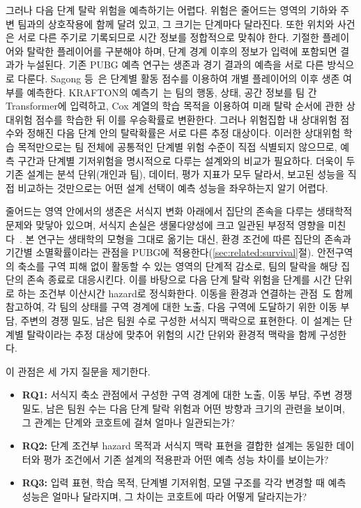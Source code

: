 그러나 다음 단계 탈락 위험을 예측하기는 어렵다.
위험은 줄어드는 영역의 기하와 주변 팀과의 상호작용에 함께 달려 있고, 그 크기는 단계마다 달라진다.
또한 위치와 사건은 서로 다른 주기로 기록되므로 시간 정보를 정합적으로 맞춰야 한다.
기절한 플레이어와 탈락한 플레이어를 구분해야 하며, 단계 경계 이후의 정보가 입력에 포함되면 결과가 누설된다.
기존 PUBG 예측 연구는 생존과 경기 결과의 예측을 서로 다른 방식으로 다룬다.
Sagong 등~\cite{Sagong25a,Sagong25b}은 단계별 활동 점수를 이용하여 개별 플레이어의 이후 생존 여부를 예측한다.
KRAFTON의 예측기~\cite{KRAFTON}는 팀의 행동, 상태, 공간 정보를 팀 간 Transformer에 입력하고, Cox 계열의 학습 목적을 이용하여 미래 탈락 순서에 관한 상대위험 점수를 학습한 뒤 이를 우승확률로 변환한다.
그러나 위험집합 내 상대위험 점수와 정해진 다음 단계 안의 탈락확률은 서로 다른 추정 대상이다.
이러한 상대위험 학습 목적만으로는 팀 전체에 공통적인 단계별 위험 수준이 직접 식별되지 않으므로, 예측 구간과 단계별 기저위험을 명시적으로 다루는 설계와의 비교가 필요하다.
더욱이 두 기존 설계는 분석 단위(개인과 팀), 데이터, 평가 지표가 모두 달라서, 보고된 성능을 직접 비교하는 것만으로는 어떤 설계 선택이 예측 성능을 좌우하는지 알기 어렵다.

줄어드는 영역 안에서의 생존은 서식지 변화 아래에서 집단의 존속을 다루는 생태학적 문제와 맞닿아 있으며, 서식지 손실은 생물다양성에 크고 일관된 부정적 영향을 미친다~\cite{Fahrig03}.
본 연구는 생태학의 모형을 그대로 옮기는 대신, 환경 조건에 따른 집단의 존속과 기간별 소멸확률이라는 관점을 PUBG에 적용한다(\ref{sec:related:survival}절).
안전구역의 축소를 구역 피해 없이 활동할 수 있는 영역의 단계적 감소로, 팀의 탈락을 해당 집단의 존속 종료로 대응시킨다.
이를 바탕으로 다음 단계 탈락 위험을 단계를 시간 단위로 하는 조건부 이산시간 hazard로 정식화한다.
이동을 환경과 연결하는 관점~\cite{Nathan08}도 함께 참고하여, 각 팀의 상태를 구역 경계에 대한 노출, 다음 구역에 도달하기 위한 이동 부담, 주변의 경쟁 밀도, 남은 팀원 수로 구성한 서식지 맥락으로 표현한다.
이 설계는 단계별 탈락이라는 추정 대상에 맞추어 위험의 시간 단위와 환경적 맥락을 함께 구성한다.

이 관점은 세 가지 질문을 제기한다.
\begin{itemize}
    \item \textbf{RQ1:}
    서식지 축소 관점에서 구성한 구역 경계에 대한 노출, 이동 부담, 주변 경쟁 밀도, 남은 팀원 수는 다음 단계 탈락 위험과 어떤 방향과 크기의 관련을 보이며, 그 관계는 단계와 코호트에 걸쳐 얼마나 일관되는가?

    \item \textbf{RQ2:}
    단계 조건부 hazard 목적과 서식지 맥락 표현을 결합한 설계는 동일한 데이터와 평가 조건에서 기존 설계의 적용판과 어떤 예측 성능 차이를 보이는가?

    \item \textbf{RQ3:}
    입력 표현, 학습 목적, 단계별 기저위험, 모델 구조를 각각 변경할 때 예측 성능은 얼마나 달라지며, 그 차이는 코호트에 따라 어떻게 달라지는가?
\end{itemize}

